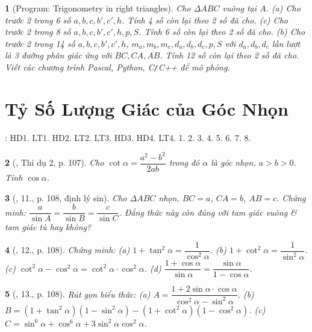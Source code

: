 \documentclass{article}
\newtheorem{baitoan}{}
\begin{document}
\begin{baitoan}[{\sf Program}: Trigonometry in right triangles]
	Cho $\Delta ABC$ vuông tại $A$. (a) Cho trước 2 trong 6 số $a,b,c,b',c',h$. Tính 4 số còn lại theo 2 số đã cho. (c) Cho trước 2 trong 8 số $a,b,c,b',c',h,p,S$. Tính 6 số còn lại theo 2 số đã cho. (b) Cho trước 2 trong 14 số $a,b,c,b',c',h$, $m_a,m_b,m_c,d_a,d_b,d_c,p,S$ với $d_a,d_b,d_c$ lần lượt là 3 đường phân giác ứng với $BC,CA,AB$. Tính 12 số còn lại theo 2 số đã cho. Viết các chương trình {\sf Pascal, Python, C{\tt/}C++} để mô phỏng.
\end{baitoan}


\section{Tỷ Số Lượng Giác của Góc Nhọn}
\cite[Chap. IV, \S1, pp. 74--81]{SGK_Toan_9_Canh_Dieu_tap_1}: HD1. LT1. HD2. LT2. LT3. HD3. HD4. LT4. 1. 2. 3. 4. 5. 6. 7. 8.

\begin{baitoan}[\cite{Tuyen_Toan_9_old}, Thí dụ 2, p. 107]
	Cho $\cot\alpha = \dfrac{a^2 - b^2}{2ab}$ trong đó $\alpha$ là góc nhọn, $a > b > 0$. Tính $\cos\alpha$.
\end{baitoan}

\begin{baitoan}[\cite{Tuyen_Toan_9_old}, 11., p. 108, định lý sin]
	Cho $\Delta ABC$ nhọn, $BC = a$, $CA = b$, $AB = c$. Chứng minh: $\dfrac{a}{\sin A} = \dfrac{b}{\sin B} = \dfrac{c}{\sin C}$. Đẳng thức này còn đúng với tam giác vuông \& tam giác tù hay không?
\end{baitoan}

\begin{baitoan}[\cite{Tuyen_Toan_9_old}, 12., p. 108]
	Chứng minh: (a) $1 + \tan^2\alpha = \dfrac{1}{\cos^2\alpha}$. (b) $1 + \cot^2\alpha = \dfrac{1}{\sin^2\alpha}$. (c) $\cot^2\alpha - \cos^2\alpha = \cot^2\alpha\cdot\cos^2\alpha$. (d) $\dfrac{1 + \cos\alpha}{\sin\alpha} = \dfrac{\sin\alpha}{1 - \cos\alpha}$.
\end{baitoan}

\begin{baitoan}[\cite{Tuyen_Toan_9_old}, 13., p. 108]
	Rút gọn biểu thức: (a) $A = \dfrac{1 + 2\sin\alpha\cdot\cos\alpha}{\cos^2\alpha - \sin^2\alpha}$. (b) $B = (1 + \tan^2\alpha)(1 - \sin^2\alpha) - (1 + \cot^2\alpha)(1 - \cos^2\alpha)$. (c) $C = \sin^6\alpha + \cos^6\alpha + 3\sin^2\alpha\cos^2\alpha$.
\end{baitoan}
\end{document}
